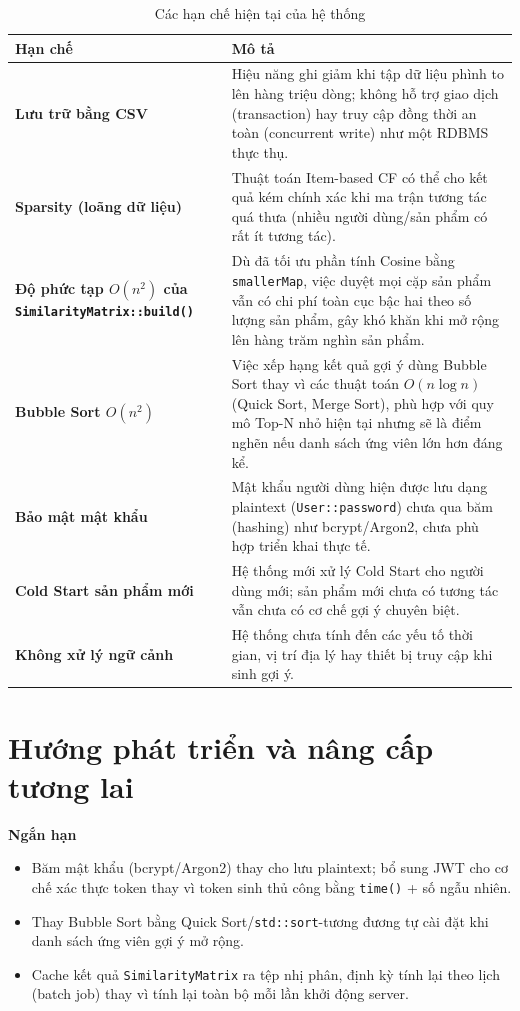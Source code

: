 \documentclass{report}
\begin{document}
\begin{table}[H]
    \centering
    \renewcommand{\arraystretch}{1.5}
    \begin{tabularx}{\textwidth}{|>{\raggedright\arraybackslash}p{4.5cm}|>{\raggedright\arraybackslash}X|}
        \hline
        \textbf{Hạn chế} & \textbf{Mô tả} \\ \hline
        \textbf{Lưu trữ bằng CSV} & Hiệu năng ghi giảm khi tập dữ liệu phình to lên hàng triệu dòng; không hỗ trợ giao dịch (transaction) hay truy cập đồng thời an toàn (concurrent write) như một RDBMS thực thụ. \\ \hline
        \textbf{Sparsity (loãng dữ liệu)} & Thuật toán Item-based CF có thể cho kết quả kém chính xác khi ma trận tương tác quá thưa (nhiều người dùng/sản phẩm có rất ít tương tác). \\ \hline
        \textbf{Độ phức tạp $O(n^2)$ của \texttt{SimilarityMatrix::build()}} & Dù đã tối ưu phần tính Cosine bằng \texttt{smallerMap}, việc duyệt mọi cặp sản phẩm vẫn có chi phí toàn cục bậc hai theo số lượng sản phẩm, gây khó khăn khi mở rộng lên hàng trăm nghìn sản phẩm. \\ \hline
        \textbf{Bubble Sort $O(n^2)$} & Việc xếp hạng kết quả gợi ý dùng Bubble Sort thay vì các thuật toán $O(n \log n)$ (Quick Sort, Merge Sort), phù hợp với quy mô Top-N nhỏ hiện tại nhưng sẽ là điểm nghẽn nếu danh sách ứng viên lớn hơn đáng kể. \\ \hline
        \textbf{Bảo mật mật khẩu} & Mật khẩu người dùng hiện được lưu dạng plaintext (\texttt{User::password}) chưa qua băm (hashing) như bcrypt/Argon2, chưa phù hợp triển khai thực tế. \\ \hline
        \textbf{Cold Start sản phẩm mới} & Hệ thống mới xử lý Cold Start cho người dùng mới; sản phẩm mới chưa có tương tác vẫn chưa có cơ chế gợi ý chuyên biệt. \\ \hline
        \textbf{Không xử lý ngữ cảnh} & Hệ thống chưa tính đến các yếu tố thời gian, vị trí địa lý hay thiết bị truy cập khi sinh gợi ý. \\ \hline
    \end{tabularx}
    \caption{Các hạn chế hiện tại của hệ thống}
    \label{tab:han_che_he_thong}
\end{table}

\section{Hướng phát triển và nâng cấp tương lai}

\textbf{Ngắn hạn}
\begin{itemize}
    \item Băm mật khẩu (bcrypt/Argon2) thay cho lưu plaintext; bổ sung JWT cho cơ chế xác thực token thay vì token sinh thủ công bằng \texttt{time()} + số ngẫu nhiên.
    \item Thay Bubble Sort bằng Quick Sort/\texttt{std::sort}-tương đương tự cài đặt khi danh sách ứng viên gợi ý mở rộng.
    \item Cache kết quả \texttt{SimilarityMatrix} ra tệp nhị phân, định kỳ tính lại theo lịch (batch job) thay vì tính lại toàn bộ mỗi lần khởi động server.
\end{itemize}
\end{document}
